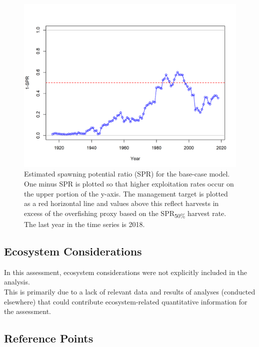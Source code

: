 \documentclass[12pt,]{article}
\begin{document}
\begin{figure}
\centering
\includegraphics{r4ss/plots_mod1/SPR2_minusSPRseries.png}
\caption{Estimated spawning potential ratio (SPR) for the base-case
model. One minus SPR is plotted so that higher exploitation rates occur
on the upper portion of the y-axis. The management target is plotted as
a red horizontal line and values above this reflect harvests in excess
of the overfishing proxy based on the SPR\textsubscript{50\%} harvest
rate. The last year in the time series is 2018. \label{fig:SPR_all}}
\end{figure}

\FloatBarrier

\subsection*{Ecosystem Considerations}\label{ecosystem-considerations}

In this assessment, ecosystem considerations were not explicitly
included in the analysis.\\
This is primarily due to a lack of relevant data and results of analyses
(conducted elsewhere) that could contribute ecosystem-related
quantitative information for the assessment.

\subsection*{Reference Points}\label{reference-points}
\end{document}
